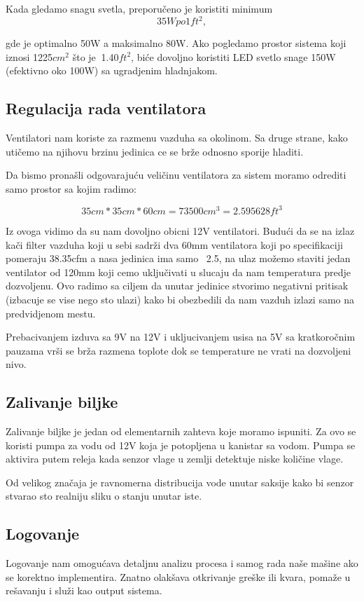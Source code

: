\documentclass[a4paper,11pt]{book}
\begin{document}
Kada gledamo snagu svetla, preporučeno je koristiti minimum 
\[35W po 1ft^2,\]

gde je optimalno 50W a maksimalno 80W. Ako pogledamo prostor sistema koji iznosi 1225$cm^2$ što je $~$1.40$ft^2$, biće dovoljno koristiti LED svetlo snage 150W (efektivno oko 100W) sa ugradjenim hladnjakom.



\subsection{Regulacija rada ventilatora}
Ventilatori nam koriste za razmenu vazduha sa okolinom. Sa druge strane, kako utičemo na njihovu brzinu jedinica ce se brže odnosno sporije hladiti.

Da bismo pronašli odgovarajuću veličinu ventilatora za sistem moramo odrediti samo prostor sa kojim radimo:

\[ 35cm * 35cm * 60cm =  73500cm^3 = 2.595628ft^3\]

Iz ovoga vidimo da su nam dovoljno obicni 12V ventilatori. Budući da se na izlaz kači filter vazduha koji u sebi sadrži dva 60mm ventilatora koji po specifikaciji pomeraju 38.35cfm a nasa jedinica ima samo ~2.5, na ulaz možemo staviti jedan ventilator od 120mm koji cemo uključivati u slucaju da nam temperatura predje dozvoljenu. Ovo radimo sa ciljem da unutar jedinice stvorimo negativni pritisak (izbacuje se vise nego sto ulazi) kako bi obezbedili da nam vazduh izlazi samo na predvidjenom mestu.

\noindent Prebacivanjem izduva sa 9V na 12V i ukljucivanjem usisa na 5V sa kratkoročnim pauzama vrši se brža razmena toplote dok se temperature ne vrati na dozvoljeni nivo. 

\subsection{Zalivanje biljke}
Zalivanje biljke je jedan od elementarnih zahteva koje moramo ispuniti. Za ovo se koristi pumpa za vodu od 12V koja je potopljena u kanistar sa vodom. Pumpa se aktivira putem releja kada senzor vlage u zemlji detektuje niske količine vlage.

\noindent Od velikog značaja je ravnomerna distribucija vode unutar saksije kako bi senzor stvarao sto realniju sliku o stanju unutar iste.



\subsection{Logovanje}
Logovanje nam omogućava detaljnu analizu procesa i samog rada naše mašine ako se korektno implementira. Znatno olakšava otkrivanje greške ili kvara, pomaže u rešavanju i služi kao output sistema.
\end{document}
